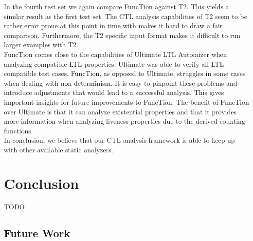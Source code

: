 \documentclass[11pt,a4paper,titlepage]{article}
\theoremstyle{definition}
\begin{document}
In the fourth test set we again compare FuncTion against T2. This yields a similar result as the first test set. 
The CTL analysis capabilities of T2 seem to be rather error prone at this 
point in time with makes it hard to draw a fair comparison.
Furthermore, the T2 specific input format makes it difficult to run larger examples with T2.\\

FuncTion comes close to the capabilities of Ultimate LTL Automizer when analyzing compatible LTL properties. 
Ultimate was able to verify all LTL compatible test cases. 
FuncTion, as opposed to Ultimate, struggles in some cases when dealing with non-determinism.  
It is easy to pinpoint these problems and introduce adjustments that
would lead to a successful analysis. This gives important insights for future improvements to FuncTion. 
The benefit of FuncTion over Ultimate is that it can analyze existential properties and that 
it provides more information when analyzing liveness properties due to the derived counting functions.\\

In conclusion, we believe that our CTL analysis framework is able to keep up with 
other available static analyzers.

\section{Conclusion}\label{sec:conclusion}
TODO
\subsection{Future Work}

\pagebreak



\end{document}
